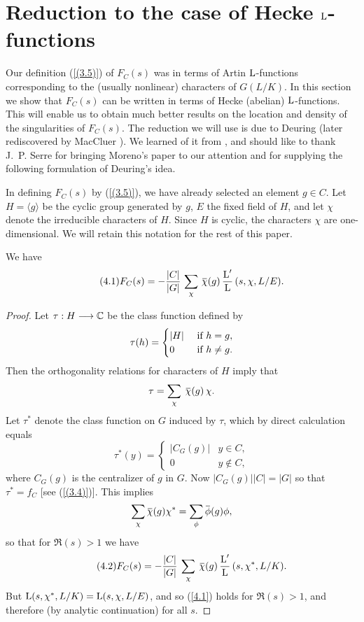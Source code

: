 \documentclass[./main]{subfiles}
\begin{document}
\section{Reduction to the case of Hecke \texorpdfstring{$\operatorname{L}$}{L}-functions}\setlength{\headheight}{22.54279pt}

Our definition (\ref{(3.5)}) of $F_C(s)$ was in terms of Artin $\operatorname{L}$-functions corresponding to the (usually nonlinear) characters of $G(L/K)$. In this section we show that $F_C(s)$ can be written in terms of Hecke (abelian) $\operatorname{L}$-functions. This will enable us to obtain much better results on the location and density of the singularities of $F_C(s)$. The reduction we will use is due to Deuring \cite{3-Deuring1935berDT} (later rediscovered by MacCluer \cite{9-maccluer1968}). We learned of it from \cite{10-Moreno}, and should like to thank J.~P. Serre for bringing Moreno's paper to our attention and for supplying the following formulation of Deuring's idea.

In defining $F_C(s)$ by (\ref{(3.5)}), we have already selected an element $g \in C$. Let $H = \langle g\rangle$ be the cyclic group generated by $g$, $E$ the fixed field of $H$, and let $\chi$ denote the irreducible characters of $H$. Since $H$ is cyclic, the characters $\chi$ are one-dimensional. We will retain this notation for the rest of this paper.
\begin{lemma} \label{4.1}
We have
\[\tag{4.1}\label{(4.1)}
    F_C(s) = -\frac{\small|C\small|}{\small|G\small|} \, \sum_{\chi}\,{\xoverline{\chi}(g)\,\frac{\L'}{\L}\,(s,\chi,L/E)}.
\]
\end{lemma}
\begin{proof}
Let $\tau : H \longrightarrow \mathbb{C}$ be the class function defined by
\[
\tau(h) = 
\begin{cases} 
\small|H\small| & \text{ if } h =g, \\
0 & \text{ if } h \neq g.
\end{cases}
\]
Then the orthogonality relations for characters of $H$ imply that
\[ \tau = \sum_{\chi}\:{\xoverline{\chi}(g)\,\chi}.\]
Let $\tau^*$ denote the class function on $G$ induced by $\tau$, which by direct calculation equals
\[
\tau^*(y) = 
\begin{cases} 
\big|C_G(g)\big| &  y\in C, \\
0 & y\notin C,
\end{cases}
\]
where $C_G(g)$ is the centralizer of $g$ in $G$. Now $\big|C_G(g)\big|\big|C\big| = \big|G\big|$ so that $\tau^* = f_C$ [see (\ref{(3.4)})]. This implies
\[\sum_{\chi}{\xoverline{\chi}(g)\chi^*} = \sum_{\phi}{\xoverline{\phi}(g)\phi}, \]
so that for $\Re{(s)}>1$ we have
\[\tag{4.2}\label{4.2}
    F_C(s) = -\frac{\small|C\small|}{\small|G\small|} \: \sum_{\chi}\:{\xoverline{\chi}(g)\,\frac{\L'}{\L}\,(s,\chi^*,L/K)}.
\]
But $\operatorname{L}(s,\chi^*,L/K) = \operatorname{L}(s,\chi,L/E)$, and so (\ref{4.1}) holds for $\Re{(s)}>1$, and therefore (by analytic continuation) for all $s$.
\end{proof}
\end{document}
